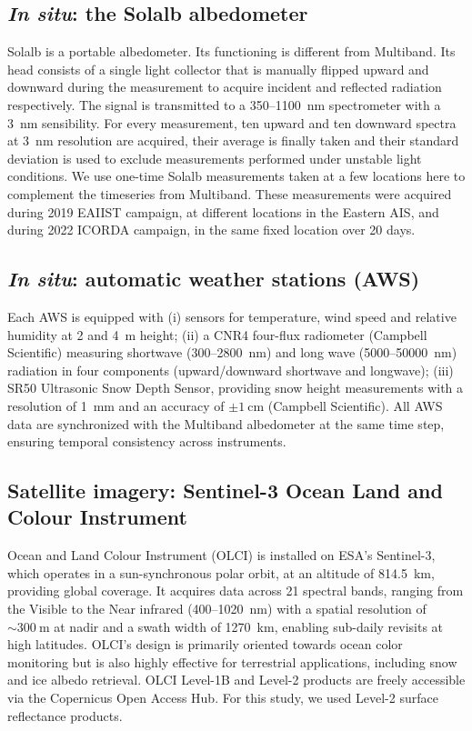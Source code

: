 \documentclass[11pt,a4paper]{article}
\begin{document}
	\subsection{\emph{In situ}: the Solalb albedometer}
	Solalb is a portable albedometer. Its functioning is different from Multiband. Its head consists of a single light collector that is manually flipped upward and downward during the measurement to acquire incident and reflected radiation respectively. The signal is transmitted to a 350--\qty{1100}{\nano\meter} spectrometer with a \qty{3}{\nano\meter} sensibility. For every measurement, ten upward and ten downward spectra at \qty{3}{\nano\meter} resolution are acquired, their average is finally taken and their standard deviation is used to exclude measurements performed under unstable light conditions.  We use one-time Solalb measurements taken at a few locations here to complement the timeseries from Multiband. These measurements were acquired during 2019 EAIIST campaign, at different locations in the Eastern AIS, and during 2022 ICORDA campaign, in the same fixed location over 20 days.
	
	\subsection{\emph{In situ}: automatic weather stations (AWS)}
Each AWS is equipped with (i) sensors for temperature, wind speed and relative humidity at 2 and \qty{4}{\meter} height; (ii) a CNR4 four-flux radiometer (Campbell Scientific) measuring shortwave (300--\qty{2800}{\nano\meter}) and long wave (5000--\qty{50000}{\nano\meter}) radiation in four components (upward/downward shortwave and longwave); (iii) SR50 Ultrasonic Snow Depth Sensor, providing snow height measurements with a resolution of \qty{1}{\milli\meter} and an accuracy of $\pm\qty{1}{\centi\meter}$ (Campbell Scientific). All AWS data are synchronized with the Multiband albedometer at the same time step, ensuring temporal consistency across instruments.
	
		\subsection{Satellite imagery: Sentinel-3 Ocean Land and Colour Instrument}
Ocean and Land Colour Instrument (OLCI) is installed on ESA's Sentinel-3, which operates in a sun-synchronous polar orbit, at an altitude of \qty{814.5}{\kilo\meter}, providing global coverage. It acquires data across 21 spectral bands, ranging from the Visible to the Near infrared (400--\qty{1020}{\nano\meter}) with a spatial resolution of $\sim\qty{300}{\meter}$ at nadir and a swath width of \qty{1270}{\kilo\meter}, enabling sub-daily revisits at high latitudes. OLCI's design is primarily oriented towards ocean color monitoring but is also highly effective for terrestrial applications, including snow and ice albedo retrieval. OLCI Level-1B and Level-2 products are freely accessible via the Copernicus Open Access Hub. For this study, we used Level-2 surface reflectance products. 
	
\end{document}
